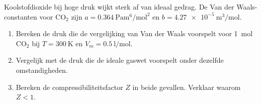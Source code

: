\begin{oefening}
Koolstofdioxide bij hoge druk wijkt sterk af van ideaal gedrag. De Van der Waals-constanten voor $\mathrm{CO_2}$ zijn $a = \SI{0.364}{\pascal\metre\tothe{6}\per\mole\tothe{2}}$ en $b = \SI{4.27e-5}{\metre\cubed\per\mole}$.
\begin{enumerate}
\item[(a)] Bereken de druk die de vergelijking van Van der Waals voorspelt voor \SI{1}{\mole} $\mathrm{CO_2}$ bij $T = \SI{300}{\kelvin}$ en $V_m = \SI{0.5}{\litre\per\mole}$.
\item[(b)] Vergelijk met de druk die de ideale gaswet voorspelt onder dezelfde omstandigheden.
\item[(c)] Bereken de compressibiliteitsfactor $Z$ in beide gevallen. Verklaar waarom $Z < 1$.
\end{enumerate}    
\end{oefening}

